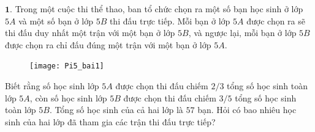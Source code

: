 \begin{multicols}{2}
	$\pmb{1.}$	Trong một cuộc thi thể thao, ban tổ chức chọn ra một số bạn học sinh ở lớp $5A$ và một số bạn ở lớp $5B$ thi đấu trực tiếp. Mỗi bạn ở lớp $5A$ được chọn ra sẽ thi đấu duy nhất một trận với một bạn ở lớp $5B$, và ngược lại, mỗi bạn ở lớp $5B$ được chọn ra chỉ đấu đúng một trận với một bạn ở lớp $5A$.
	\begin{figure}[H]
		\centering
		\vspace*{-5pt}
		\captionsetup{labelformat= empty, justification=centering}
		\texttt{[image: Pi5\_bai1]}
		\vspace*{-15pt}
	\end{figure}
	Biết rằng số học sinh lớp $5A$ được chọn thi đấu chiếm $2/3$ tổng số học sinh toàn lớp $5A$, còn số học sinh lớp $5B$ được chọn thi đấu chiếm $3/5$ tổng số học sinh toàn lớp $5B$. Tổng số học sinh của cả hai lớp là $57$ bạn. Hỏi có bao nhiêu học sinh của hai lớp đã tham gia các trận thi đấu trực tiếp?
	

\end{multicols}
